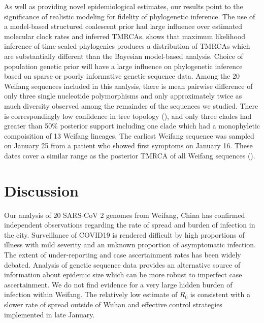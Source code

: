 \documentclass[9pt,lineno,onehalfspacing]{elife}
\begin{document}
As well as providing novel epidemiological estimates, our results point to the significance of realistic modeling for fidelity of phylogenetic inference.
The use of a model-based structured coalescent prior had large influence over estimated molecular clock rates and inferred TMRCAs. 
 shows that maximum likelihood inference of time-scaled phylogenies produces a distribution of TMRCAs which are substantially different than the Bayesian model-based analysis.
Choice of population genetic prior will have a large influence on phylogenetic inference based on sparse or poorly informative genetic sequence data. 
Among the 20 Weifang sequences included in this analysis, there is mean pairwise difference of only three single nucleotide polymorphisms and only approximately twice as much diversity observed among the remainder of the sequences we studied. 
There is correspondingly low confidence in tree topology (), and only three clades had greater than 50\% posterior support including one clade which had a monophyletic compoisition of 13 Weifang lineages. 
The earliest Weifang sequence was sampled on January 25 from a patient who showed first symptoms on January 16. These dates cover a similar range as the posterior TMRCA of all Weifang sequences ().


\section{Discussion}

Our analysis of 20 SARS-CoV 2 genomes from Weifang, China has confirmed independent observations regarding the rate of spread and burden of infection in the city.
Surveillance of COVID19 is rendered difficult by high proportions of illness with mild severity and an unknown proportion of asymptomatic infection\citep{Guan2020-ql}. 
The extent of under-reporting and case ascertainment rates has been widely debated. 
Analysis of genetic sequence data provides an alternative source of information about epidemic size which can be more robust to imperfect case ascertainment. 
We do not find evidence for a very large hidden burden of infection within Weifang. 
The relatively low estimate of $R_0$ is consistent with a slower rate of spread outside of Wuhan and effective control strategies implemented in late January. 
\end{document}

